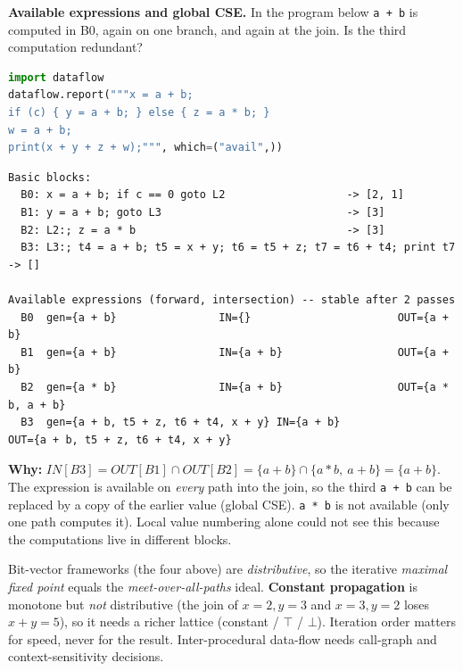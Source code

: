 \documentclass[10pt,a4paper,openany,oneside]{report}
\begin{document}
\textbf{Available expressions and global CSE.} In the program below \texttt{a + b} is computed in B0, again on one branch, and again at the join. Is the third computation redundant?
\begin{lstlisting}[language={Python}]
import dataflow
dataflow.report("""x = a + b;
if (c) { y = a + b; } else { z = a * b; }
w = a + b;
print(x + y + z + w);""", which=("avail",))
\end{lstlisting}
\begin{lstlisting}[style=out,title={Captured output}]
Basic blocks:
  B0: x = a + b; if c == 0 goto L2                   -> [2, 1]
  B1: y = a + b; goto L3                             -> [3]
  B2: L2:; z = a * b                                 -> [3]
  B3: L3:; t4 = a + b; t5 = x + y; t6 = t5 + z; t7 = t6 + t4; print t7 -> []

Available expressions (forward, intersection) -- stable after 2 passes
  B0  gen={a + b}                IN={}                       OUT={a + b}
  B1  gen={a + b}                IN={a + b}                  OUT={a + b}
  B2  gen={a * b}                IN={a + b}                  OUT={a * b, a + b}
  B3  gen={a + b, t5 + z, t6 + t4, x + y} IN={a + b}                  OUT={a + b, t5 + z, t6 + t4, x + y}
\end{lstlisting}
\textbf{Why:} $IN[B3]=OUT[B1]\cap OUT[B2]=\{a+b\}\cap\{a*b,\ a+b\}=\{a+b\}$. The expression is available on \emph{every} path into the join, so the third \texttt{a + b} can be replaced by a copy of the earlier value (global CSE). \texttt{a * b} is not available (only one path computes it). Local value numbering alone could not see this because the computations live in different blocks.
\begin{trapbox}
Bit-vector frameworks (the four above) are \emph{distributive}, so the iterative \emph{maximal fixed point} equals the \emph{meet-over-all-paths} ideal. \textbf{Constant propagation} is monotone but \emph{not} distributive (the join of $x{=}2,y{=}3$ and $x{=}3,y{=}2$ loses $x{+}y{=}5$), so it needs a richer lattice (constant / $\top$ / $\bot$). Iteration order matters for speed, never for the result. Inter-procedural data-flow needs call-graph and context-sensitivity decisions.
\end{trapbox}
\end{document}
